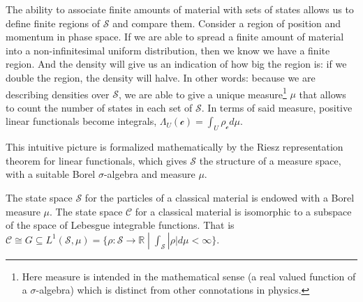 \documentclass[smallextended]{svjour3}
\numberwithin{equation}{section}
\begin{document}
The ability to associate finite amounts of material with sets of states allows us to define finite regions of $\mathcal{S}$ and compare them. Consider a region of position and momentum in phase space. If we are able to spread a finite amount of material into a non-infinitesimal uniform distribution, then we know we have a finite region. And the density will give us an indication of how big the region is: if we double the region, the density will halve. In other words: because we are describing densities over $\mathcal{S}$, we are able to give a unique measure\footnote{Here measure is intended in the mathematical sense (a real valued function of a $\sigma$-algebra) which is distinct from other connotations in physics.} $\mu$ that allows to count the number of states in each set of $\mathcal{S}$. In terms of said measure, positive linear functionals become integrals, $\Lambda_U (\mathcal{c}) = \int_U \rho_{\mathcal{c}} d \mu$.

This intuitive picture is formalized mathematically by the Riesz representation theorem for linear functionals, which gives $\mathcal{S}$ the structure of a measure space, with a suitable Borel $\sigma$-algebra and measure $\mu$.

\begin{prop}\label{prop:integration}
	The state space $\mathcal{S}$ for the particles of a classical material is endowed with a Borel measure $\mu$. The state space $\mathcal{C}$ for a classical material is isomorphic to a subspace of the space of Lebesgue integrable functions. That is $\mathcal{C} \cong G \subseteq L^1(\mathcal{S}, \mu) = \{ \rho : \mathcal{S} \rightarrow \mathbb{R} \; | \; \int_{\mathcal{S}} |\rho| d\mu < \infty \}$.
\end{prop}
\end{document}
